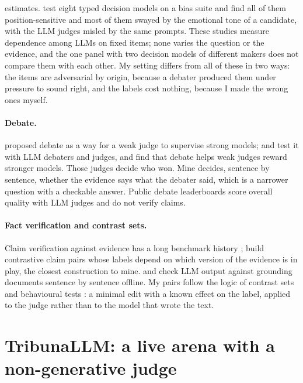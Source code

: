 \documentclass[11pt,a4paper]{article}
\begin{document}
estimates. \citet{lukassen2026biased} test eight typed decision models on a bias suite and find all of them position-sensitive and most of them swayed by the emotional tone of a candidate, with the LLM judges misled by the same prompts. These studies measure dependence among LLMs on fixed items; none varies the question or the evidence, and the one panel with two decision models of different makers does not compare them with each other. My setting differs from all of these in two ways: the items are adversarial by origin, because a debater produced them under pressure to sound right, and the labels cost nothing, because I made the wrong ones myself.

\paragraph{Debate.}
\citet{irving2018debate} proposed debate as a way for a weak judge to supervise strong models; \citet{khan2024debate} and \citet{kenton2024oversight} test it with LLM debaters and judges, and \citet{elasky2026debate} find that debate helps weak judges reward stronger models. Those judges decide who won. Mine decides, sentence by sentence, whether the evidence says what the debater said, which is a narrower question with a checkable answer. Public debate leaderboards \citep{mazur2026debate} score overall quality with LLM judges and do not verify claims.

\paragraph{Fact verification and contrast sets.}
Claim verification against evidence has a long benchmark history \citep{thorne2018fever}; \citet{atanasova2022insufficient} build contrastive claim pairs whose labels depend on which version of the evidence is in play, the closest construction to mine. \citet{tang2024minicheck} and \citet{wang2023factcheckgpt} check LLM output against grounding documents sentence by sentence offline. My pairs follow the logic of contrast sets \citep{gardner2020contrast} and behavioural tests \citep{ribeiro2020checklist}: a minimal edit with a known effect on the label, applied to the judge rather than to the model that wrote the text.

\section{TribunaLLM: a live arena with a non-generative judge}
\label{sec:system}
\end{document}
